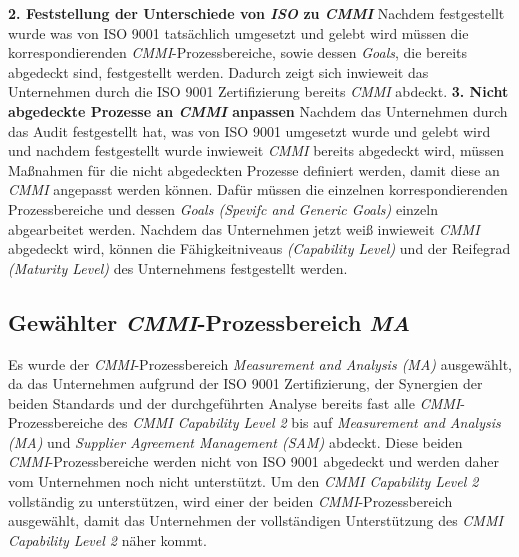 \newline
\newline
\textbf{2. Feststellung der Unterschiede von \emph{ISO} zu \emph{CMMI}}
\newline
Nachdem festgestellt wurde was von ISO 9001 tatsächlich umgesetzt und gelebt wird müssen die korrespondierenden \emph{CMMI}-Prozessbereiche, sowie dessen \emph{Goals}, die bereits abgedeckt sind, festgestellt werden. Dadurch zeigt sich inwieweit  das Unternehmen durch die ISO 9001 Zertifizierung bereits \emph{CMMI} abdeckt. 
\newline
\newline
\textbf{3. Nicht abgedeckte Prozesse an \emph{CMMI} anpassen}
\newline
Nachdem das Unternehmen durch das Audit festgestellt hat, was von ISO 9001 umgesetzt wurde und gelebt wird und nachdem festgestellt wurde inwieweit \emph{CMMI} bereits abgedeckt wird, müssen Maßnahmen für die nicht abgedeckten Prozesse definiert werden, damit diese an \emph{CMMI} angepasst werden können. Dafür müssen die einzelnen korrespondierenden Prozessbereiche und dessen \emph{Goals (Spevifc and Generic Goals)} einzeln abgearbeitet werden. 
\newline
\newline
Nachdem das Unternehmen jetzt weiß inwieweit \emph{CMMI} abgedeckt wird, können die Fähigkeitniveaus \emph{(Capability Level)} und der Reifegrad \emph{(Maturity Level)} des Unternehmens festgestellt werden.  
\newpage

\subsection{Gewählter \emph{CMMI}-Prozessbereich \emph{MA}}
Es wurde der \emph{CMMI}-Prozessbereich \emph{Measurement and Analysis (MA)} ausgewählt, da das Unternehmen aufgrund der ISO 9001 Zertifizierung, der Synergien der beiden Standards und der durchgeführten Analyse bereits fast alle \emph{CMMI}-Prozessbereiche des \emph{CMMI Capability Level 2} bis auf \emph{Measurement and Analysis (MA)} und \emph{Supplier Agreement Management (SAM)} abdeckt. Diese beiden \emph{CMMI}-Prozessbereiche werden nicht von ISO 9001 abgedeckt und werden daher vom Unternehmen noch nicht unterstützt. Um den \emph{CMMI Capability Level 2} vollständig zu unterstützen, wird einer der beiden \emph{CMMI}-Prozessbereich ausgewählt, damit das Unternehmen der vollständigen Unterstützung des \emph{CMMI Capability Level 2} näher kommt.
